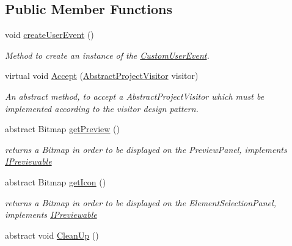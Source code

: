 \subsection*{Public Member Functions}
\begin{DoxyCompactItemize}
\item 
void \hyperlink{class_a_rdev_kit_1_1_model_1_1_project_1_1_abstract_augmentation_a4f4497d02cdf208b57b4e3f90a6130fd}{create\-User\-Event} ()
\begin{DoxyCompactList}\small\item\em Method to create an instance of the \hyperlink{class_a_rdev_kit_1_1_model_1_1_project_1_1_custom_user_event}{Custom\-User\-Event}. \end{DoxyCompactList}\item 
virtual void \hyperlink{class_a_rdev_kit_1_1_model_1_1_project_1_1_abstract_augmentation_a2b3fa5e94428fab7f2d94842211a7cc9}{Accept} (\hyperlink{class_a_rdev_kit_1_1_controller_1_1_project_controller_1_1_abstract_project_visitor}{Abstract\-Project\-Visitor} visitor)
\begin{DoxyCompactList}\small\item\em An abstract method, to accept a Abstract\-Project\-Visitor which must be implemented according to the visitor design pattern. \end{DoxyCompactList}\item 
abstract Bitmap \hyperlink{class_a_rdev_kit_1_1_model_1_1_project_1_1_abstract_augmentation_a627330061b5df53ece5646e1cf83ff0f}{get\-Preview} ()
\begin{DoxyCompactList}\small\item\em returns a Bitmap in order to be displayed on the Preview\-Panel, implements \hyperlink{interface_a_rdev_kit_1_1_model_1_1_project_1_1_i_previewable}{I\-Previewable} \end{DoxyCompactList}\item 
abstract Bitmap \hyperlink{class_a_rdev_kit_1_1_model_1_1_project_1_1_abstract_augmentation_a703566211752c4c4e08ceb5b6c528918}{get\-Icon} ()
\begin{DoxyCompactList}\small\item\em returns a Bitmap in order to be displayed on the Element\-Selection\-Panel, implements \hyperlink{interface_a_rdev_kit_1_1_model_1_1_project_1_1_i_previewable}{I\-Previewable} \end{DoxyCompactList}\item 
abstract void \hyperlink{class_a_rdev_kit_1_1_model_1_1_project_1_1_abstract_augmentation_a29b5dcf0bea3da72b75707e09f42124f}{Clean\-Up} ()

\end{DoxyCompactItemize}
